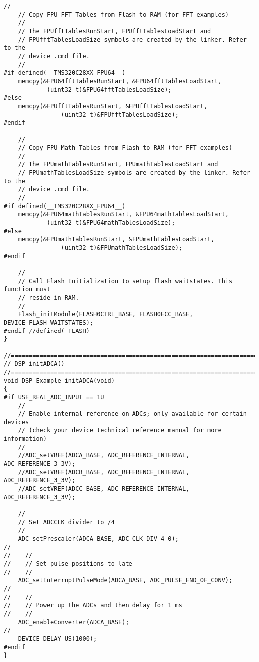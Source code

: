 \begin{lstlisting}[caption=\raggedright{mcu-libs/RLS.h}, frame=single]
    //
    // Copy FPU FFT Tables from Flash to RAM (for FFT examples)
    //
    // The FPUfftTablesRunStart, FPUfftTablesLoadStart and
    // FPUfftTablesLoadSize symbols are created by the linker. Refer to the
    // device .cmd file.
    //
#if defined(__TMS320C28XX_FPU64__)
    memcpy(&FPU64fftTablesRunStart, &FPU64fftTablesLoadStart,
            (uint32_t)&FPU64fftTablesLoadSize);
#else
    memcpy(&FPUfftTablesRunStart, &FPUfftTablesLoadStart,
                (uint32_t)&FPUfftTablesLoadSize);
#endif

    //
    // Copy FPU Math Tables from Flash to RAM (for FFT examples)
    //
    // The FPUmathTablesRunStart, FPUmathTablesLoadStart and
    // FPUmathTablesLoadSize symbols are created by the linker. Refer to the
    // device .cmd file.
    //
#if defined(__TMS320C28XX_FPU64__)
    memcpy(&FPU64mathTablesRunStart, &FPU64mathTablesLoadStart,
            (uint32_t)&FPU64mathTablesLoadSize);
#else
    memcpy(&FPUmathTablesRunStart, &FPUmathTablesLoadStart,
                (uint32_t)&FPUmathTablesLoadSize);
#endif

    //
    // Call Flash Initialization to setup flash waitstates. This function must
    // reside in RAM.
    //
    Flash_initModule(FLASH0CTRL_BASE, FLASH0ECC_BASE, DEVICE_FLASH_WAITSTATES);
#endif //defined(_FLASH)
}

//=============================================================================
// DSP_initADCA()
//=============================================================================
void DSP_Example_initADCA(void)
{
#if USE_REAL_ADC_INPUT == 1U
    //
    // Enable internal reference on ADCs; only available for certain devices
    // (check your device technical reference manual for more information)
    //
    //ADC_setVREF(ADCA_BASE, ADC_REFERENCE_INTERNAL, ADC_REFERENCE_3_3V);
    //ADC_setVREF(ADCB_BASE, ADC_REFERENCE_INTERNAL, ADC_REFERENCE_3_3V);
    //ADC_setVREF(ADCC_BASE, ADC_REFERENCE_INTERNAL, ADC_REFERENCE_3_3V);

    //
    // Set ADCCLK divider to /4
    //
    ADC_setPrescaler(ADCA_BASE, ADC_CLK_DIV_4_0);
//
//    //
//    // Set pulse positions to late
//    //
    ADC_setInterruptPulseMode(ADCA_BASE, ADC_PULSE_END_OF_CONV);
//
//    //
//    // Power up the ADCs and then delay for 1 ms
//    //
    ADC_enableConverter(ADCA_BASE);
//
    DEVICE_DELAY_US(1000);
#endif
}


\end{lstlisting}
